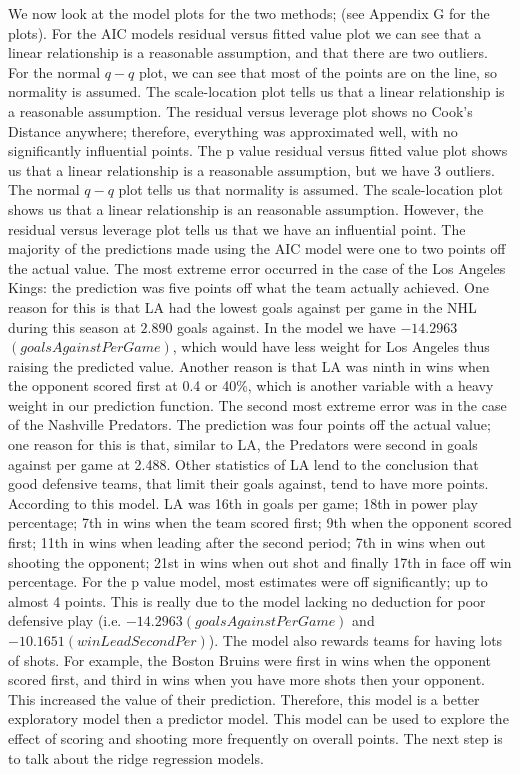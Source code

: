 \newpage
We now look at the model plots for the two methods; (see Appendix G for the plots). For the AIC models residual versus fitted value plot we can see that a linear relationship is a reasonable assumption, and that there are two outliers. For the normal $q-q$ plot, we can see that most of the points are on the line, so normality is assumed. The scale-location plot tells us that a linear relationship is a reasonable assumption. The residual versus leverage plot shows no Cook's Distance anywhere; therefore, everything was approximated well, with no significantly influential points. The p value residual versus fitted value plot shows us that a linear relationship is a reasonable assumption, but we have 3 outliers. The normal $q-q$ plot tells us that normality is assumed. The scale-location plot shows us that a linear relationship is an reasonable assumption. However, the residual versus leverage plot tells us that we have an influential point. 
The majority of the predictions made using the AIC model were one to two points off the actual value. The most extreme error occurred in the case of the Los Angeles Kings: the prediction was five points off what the team actually achieved. One reason for this is that LA had the lowest goals against per game in the NHL during this season at $2.890$ goals against. In the model we have $- 14.2963$$(goalsAgainstPerGame)$, which would have less weight for Los Angeles thus raising the predicted value. Another reason is that LA was ninth in wins when the opponent scored first at 0.4 or 40\%, which is another variable with a heavy weight in our prediction function. The second most extreme error was in the case of the Nashville Predators. The prediction was four points off the actual value; one reason for this is that, similar to LA, the Predators were second in goals against per game at 2.488. Other statistics of LA lend to the conclusion that good defensive teams, that limit their goals against, tend to have more points. According to this model. LA was 16th in goals per game; 18th in power play percentage; 7th in wins when the team scored first; 9th when the opponent scored first; 11th in wins when leading after the second period; 7th in wins when out shooting the opponent; 21st in wins when out shot and finally 17th in face off win percentage. For the p value model, most estimates were off significantly; up to almost 4 points. This is really due to the model lacking no deduction for poor defensive play (i.e. $- 14.2963(goalsAgainstPerGame)$ and $- 10.1651(winLeadSecondPer)$). The model also rewards teams for having lots of shots. For example, the Boston Bruins were first in wins when the opponent scored first, and third in wins when you have more shots then your opponent. This increased the value of their prediction. Therefore, this model is a better exploratory model then a predictor model. This model can be used to explore the effect of scoring and shooting more frequently on overall points. The next step is to talk about the ridge regression models.
